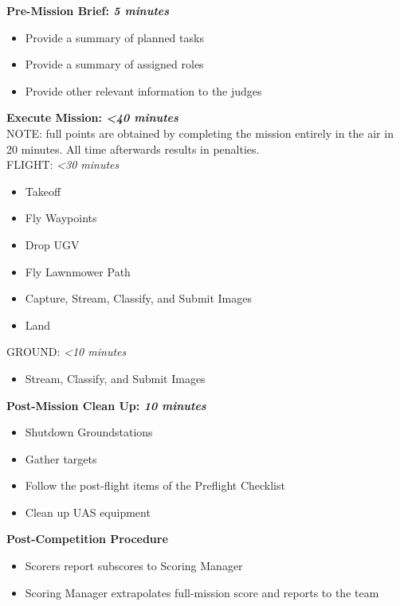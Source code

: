 \documentclass[]{auvsi_doc}
\begin{document}
\hrulefill

\textbf{Pre-Mission Brief: \textit{5 minutes}}
\begin{itemize}
	\item Provide a summary of planned tasks
	\item Provide a summary of assigned roles
	\item Provide other relevant information to the judges
\end{itemize}

\hrulefill

\textbf{Execute Mission: \textit{\textless40 minutes}}\\
\tiny{NOTE: full points are obtained by completing the mission entirely in the air in 20 minutes. All time afterwards results in penalties.}\\
FLIGHT: \textit{\textless30 minutes}
\begin{itemize}
	\item Takeoff
	\item Fly Waypoints
	\item Drop UGV
	\item Fly Lawnmower Path
	\item Capture, Stream, Classify, and Submit Images
	\item Land
\end{itemize}

GROUND: \textit{\textless10 minutes}
\begin{itemize}
	\item Stream, Classify, and Submit Images
\end{itemize}

\hrulefill

\textbf{Post-Mission Clean Up: \textit{10 minutes}}
\begin{itemize}
	\item Shutdown Groundstations
	\item Gather targets
	\item Follow the post-flight items of the Preflight Checklist
	\item Clean up UAS equipment
\end{itemize}

\textbf{Post-Competition Procedure}
\begin{itemize}
	\item Scorers report subscores to Scoring Manager
	\item Scoring Manager extrapolates full-mission score and reports to the team
\end{itemize}
\end{document}
